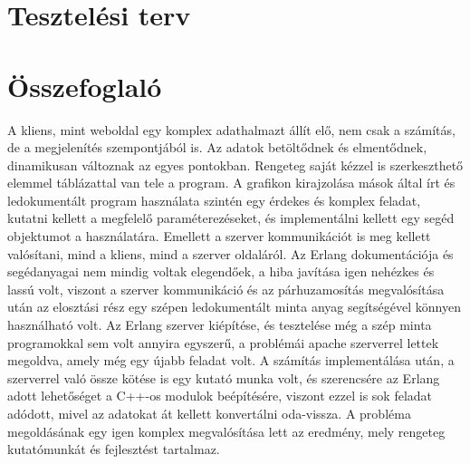 \section{Tesztelési terv}


\newpage
\section{Összefoglaló}
	A kliens, mint weboldal egy komplex adathalmazt állít elő, nem csak a számítás, de a megjelenítés szempontjából is. Az adatok betöltődnek és elmentődnek, dinamikusan változnak az egyes pontokban. Rengeteg saját kézzel is szerkeszthető elemmel táblázattal van tele a program. A grafikon kirajzolása mások által írt és ledokumentált program használata szintén egy érdekes és komplex feladat, kutatni kellett a megfelelő paraméterezéseket, és implementálni kellett egy segéd objektumot a használatára.\newline
	Emellett a szerver kommunikációt is meg kellett valósítani, mind a kliens, mind a szerver oldaláról. \newline
	Az Erlang dokumentációja és segédanyagai nem mindig voltak elegendőek, a hiba javítása igen nehézkes és lassú volt, viszont a szerver kommunikáció és az párhuzamosítás megvalósítása után az elosztási rész egy szépen ledokumentált minta anyag segítségével könnyen használható volt. \newline  
	Az Erlang szerver kiépítése, és tesztelése még a szép minta programokkal sem volt annyira egyszerű, a problémái apache szerverrel lettek megoldva, amely még egy újabb feladat volt. \newline
	A számítás implementálása után, a szerverrel való össze kötése is egy kutató munka volt, és szerencsére az Erlang adott lehetőséget a C++-os modulok beépítésére, viszont ezzel is sok feladat adódott, mivel az adatokat át kellett konvertálni oda-vissza.
	\newline
	A probléma megoldásának egy igen komplex megvalósítása lett az eredmény, mely rengeteg kutatómunkát és fejlesztést tartalmaz.
